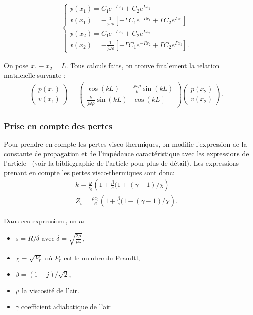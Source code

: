 \begin{eqnarray*}
\begin{cases}
p(x_1)  =  C_1 e^{-\Gamma x_1} + C_2 e^{\Gamma x_1} \\
v(x_1)  =  -\frac{1}{j\omega\rho} [ -\Gamma C_1 e^{-\Gamma x_1} + \Gamma C_2 e^{\Gamma x_1}]\\
p(x_2)  =  C_1 e^{-\Gamma x_2} + C_2 e^{\Gamma x_2} \\
v(x_2)  =  -\frac{1}{j\omega\rho} [ -\Gamma C_1 e^{-\Gamma x_2} + \Gamma C_2 e^{\Gamma x_2}].
\end{cases}
\end{eqnarray*}
 
On pose $x_1 - x_2 = L$. Tous calculs faits, on trouve finalement la relation matricielle suivante :
\begin{eqnarray*}
\begin{pmatrix} p(x_1) \\ v(x_1) \end{pmatrix} = \begin{pmatrix} \cos(kL) & \frac{j\omega\rho}{k} \sin(k L) \\  \frac{k}{j\omega\rho}\sin(k L) & \cos(k L) \end{pmatrix} \begin{pmatrix} p(x_2) \\ v(x_2)
\end{pmatrix}.
\end{eqnarray*}

\subsubsection{Prise en compte des pertes}

Pour prendre en compte les pertes visco-thermiques, on modifie l'expression de la constante de propagation et de l'impédance caractéristique avec les expressions de l'article~\cite{slow} (voir la bibliographie de l'article pour plus de détail). Les expressions prenant en compte les pertes visco-thermiques sont donc:
\begin{eqnarray*}
 k =  \frac{\omega}{c_0} \left( 1 + \frac{\beta}{s}(1+(\gamma-1)/ \chi \right) \\
Z_c =  \frac{\rho c_0}{S} \left( 1 + \frac{\beta}{s}(1-(\gamma-1)/ \chi \right). 
\end{eqnarray*}

Dans ces expressions, on a:
\begin{itemize}
 \item  $s=R/ \delta$ avec $\delta = \sqrt{\frac{2 \mu}{\rho \omega}}$,
 \item  $\chi = \sqrt{P_r}$ où $P_r$ est le nombre de Prandtl,
 \item $\beta = (1-j)/\sqrt{2}$,
 \item $\mu$ la viscosité de l'air.
 \item $\gamma$ coefficient adiabatique de l'air
\end{itemize}

